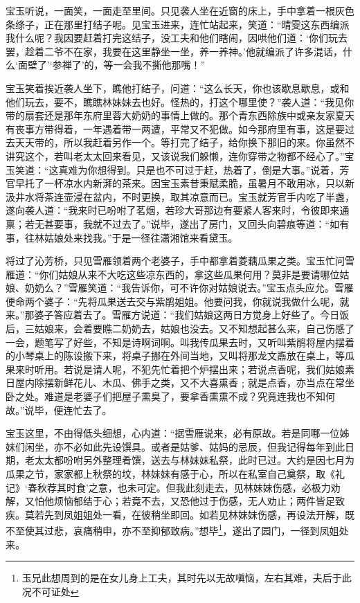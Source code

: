 \documentclass[12pt,oneside]{book}
\begin{document}
宝玉听说，一面笑，一面走至里间。只见袭人坐在近窗的床上，手中拿着一根灰色条绦子，正在那里打结子呢。见宝玉进来，连忙站起来，笑道：“晴雯这东西编派我什么呢？我因要赶着打完这结子，没工夫和他们瞎闹，因哄他们道：‘你们玩去罢，趁着二爷不在家，我要在这里静坐一坐，养一养神。’他就编派了许多混话，什么‘面壁了’‘参禅了’的，等一会我不撕他那嘴！”

宝玉笑着挨近袭人坐下，瞧他打结子，问道：“这么长天，你也该歇息歇息，或和他们玩去，要不，瞧瞧林妹妹去也好。怪热的，打这个哪里使？”袭人道：“我见你带的扇套还是那年东府里蓉大奶奶的事情上做的。那个青东西除族中或亲友家夏天有丧事方带得着，一年遇着带一两遭，平常又不犯做。如今那府里有事，这是要过去天天带的，所以我赶着另作一个。等打完了结子，给你换下那旧的来。你虽然不讲究这个，若叫老太太回来看见，又该说我们躲懒，连你穿带之物都不经心了。”宝玉笑道：“这真难为你想得到。只是也不可过于赶，热着了，倒是大事。”说着，芳官早托了一杯凉水内新湃的茶来。因宝玉素昔秉赋柔脆，虽暑月不敢用冰，只以新汲井水将茶连壶浸在盆内，不时更换，取其凉意而已。宝玉就芳官手内吃了半盏，遂向袭人道：“我来时已吩咐了茗烟，若珍大哥那边有要紧人客来时，令彼即来通禀；若无甚要事，我就不过去了。”说毕，遂出了房门，又回头向碧痕等道：“如有事，往林姑娘处来找我。”于是一径往潇湘馆来看黛玉。

将过了沁芳桥，只见雪雁领着两个老婆子，手中都拿着菱藕瓜果之类。宝玉忙问雪雁道：“你们姑娘从来不大吃这些凉东西的，拿这些瓜果何用？莫非是要请哪位姑娘、奶奶么？”雪雁笑道：“我告诉你，可不许你对姑娘说去。”宝玉点头应允。雪雁便命两个婆子：“先将瓜果送去交与紫鹃姐姐。他要问我，你就说我做什么呢，就来。”那婆子答应着去了。雪雁方说道：“我们姑娘这两日方觉身上好些了。今日饭后，三姑娘来，会着要瞧二奶奶去，姑娘也没去。又不知想起甚么来，自己伤感了一会，题笔写了好些，不知是诗啊词啊。叫我传瓜果去时，又听叫紫鹃将屋内摆着的小琴桌上的陈设搬下来，将桌子挪在外间当地，又叫将那龙文鼒放在桌上，等瓜果来时听用。若说是请人呢，不犯先忙着把个炉摆出来；若说点香呢，我们姑娘素日屋内除摆新鲜花儿、木瓜、佛手之类，又不大喜熏香﹔就是点香，亦当点在常坐卧之处。难道是老婆子们把屋子熏臭了，要拿香熏熏不成？究竟连我也不知何故。”说毕，便连忙去了。

宝玉这里，不由得低头细想，心内道：“据雪雁说来，必有原故。若是同哪一位姊妹们闲坐，亦不必如此先设馔具。或者是姑爹、姑妈的忌辰，但我记得每年到此日期，老太太都吩咐另外整理肴馔，送去与林妹妹私祭，此时已过。大约是因七月为瓜果之节，家家都上秋祭的坟，林妹妹有感于心，所以在私室自己奠祭，取《礼记》‘春秋荐其时食’之意，也未可定。但我此刻走去，见林妹妹伤感，必极力劝解，又怕他烦恼郁结于心；若竟不去，又恐他过于伤感，无人劝止；两件皆足致疾。莫若先到凤姐姐处一看，在彼稍坐即回。如若见林妹妹伤感，再设法开解，既不至使其过悲，哀痛稍申，亦不至抑郁致病。”想毕\footnote{玉兄此想周到的是在女儿身上工夫，其时先以无故嗔恼，左右其难，夫后于此况不可证处}，遂出了园门，一径到凤姐处来。
\end{document}
